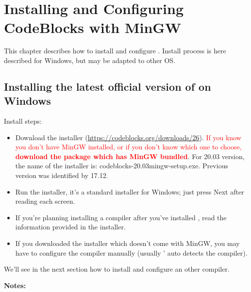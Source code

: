 \chapter{Installing and Configuring CodeBlocks with MinGW}\label{sec:install_codeblocks}

This chapter describes how to install and configure \codeblocks. Install process is here described for Windows, but may be adapted to other OS.

\section{Installing the latest official version of \codeblocks on Windows}

Install steps:
\begin{itemize}
\item Download the \codeblocks installer (\url{https://codeblocks.org/downloads/26}). \textcolor{red}{If you know you don't have MinGW installed, or if you don't know which one to choose, \textbf{download the package which has MinGW bundled}}. For 20.03 version, the name of the installer is: codeblocks-20.03mingw-setup.exe. Previous version was identified by 17.12.
\item Run the installer, it's a standard installer for Windows; just press Next after reading each screen.
\item If you're planning installing a compiler after you've installed \codeblocks, read the information provided in the installer.
\item If you downloaded the installer which doesn't come with MinGW, you may have to configure the compiler manually (usually \codeblocks' auto detects the compiler).
\end{itemize}

We'll see in the next section how to install and configure an other compiler.

\textbf{Notes:}

